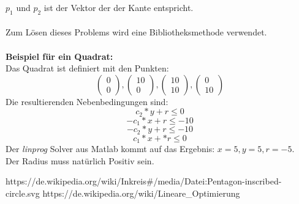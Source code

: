 \documentclass[conference]{IEEEtran}
\begin{document}
	$p_1$ und $p_2$ ist der Vektor der der Kante entspricht.\\
	\\
	Zum Lösen dieses Problems wird eine Bibliotheksmethode verwendet.\\
	\\
	\textbf{Beispiel für ein Quadrat:}\\
	Das Quadrat ist definiert mit den Punkten:
	\[\left(\begin{array}{c}0\\0\end{array}\right) , \left(\begin{array}{c}10\\0\end{array}\right),\left(\begin{array}{c}10\\10\end{array}\right),\left(\begin{array}{c}0\\10\end{array}\right)\] 
	Die resultierenden Nebenbedingungen sind:
	\[ c_2*y+r \leq 0 \]
	\[ -c_1*x+r \leq -10 \]
	\[ -c_2*y+r \leq -10 \]
	\[ c_1*x+*r \leq 0 \]
	Der \textit{linprog} Solver aus Matlab kommt auf das Ergebnis: $x = 5, y = 5, r = -5$.\\
	Der Radius muss natürlich Positiv sein.
	
	
	
	\begin{thebibliography}{00}
		https://de.wikipedia.org/wiki/Inkreis\#/media/Datei:Pentagon-inscribed-circle.svg
		https://de.wikipedia.org/wiki/Lineare\_Optimierung
	\end{thebibliography}
	
	
	
\end{document}
